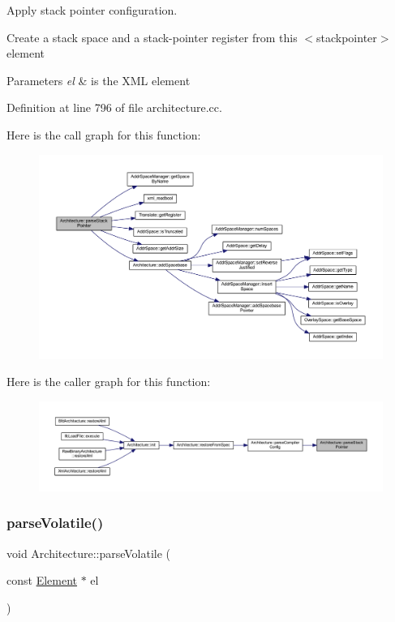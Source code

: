 Apply stack pointer configuration. 

Create a stack space and a stack-\/pointer register from this $<$stackpointer$>$ element 
\begin{DoxyParams}{Parameters}
{\em el} & is the X\+ML element \\
\hline
\end{DoxyParams}


Definition at line 796 of file architecture.\+cc.

Here is the call graph for this function\+:
\nopagebreak
\begin{figure}[H]
\begin{center}
\leavevmode
\includegraphics[width=350pt]{class_architecture_aac48da0d464ff216982db607b43d4757_cgraph}
\end{center}
\end{figure}
Here is the caller graph for this function\+:
\nopagebreak
\begin{figure}[H]
\begin{center}
\leavevmode
\includegraphics[width=350pt]{class_architecture_aac48da0d464ff216982db607b43d4757_icgraph}
\end{center}
\end{figure}
\mbox{\label{class_architecture_a90175b3753d44c818064e08425c57d97}} 
\subsubsection{\texorpdfstring{parseVolatile()}{parseVolatile()}}
{\footnotesize\ttfamily void Architecture\+::parse\+Volatile (\begin{DoxyParamCaption}\item[{const \mbox{\hyperlink{class_element}{Element}} $\ast$}]{el }\end{DoxyParamCaption})\hspace{0.3cm}{\ttfamily [protected]}}



